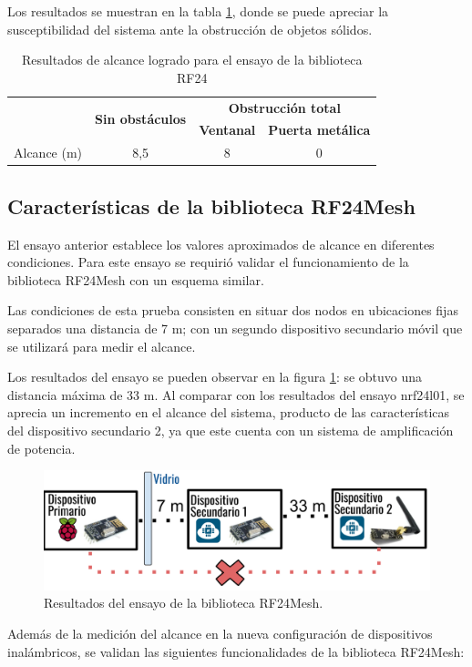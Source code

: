 Los resultados se muestran en la tabla \ref{tab:tabla_1}, donde se puede apreciar la susceptibilidad del sistema ante la obstrucción de objetos sólidos.

\begin{table}[h]
\centering
\caption[Resultados ensayo biblioteca RF24]{Resultados de alcance logrado para el ensayo de la biblioteca RF24}
\begin{tabular}{lccc}
\toprule
\textbf{}                       & \multirow{2}{*}{\textbf{Sin obstáculos}} & \multicolumn{2}{c}{\textbf{Obstrucción total}} \\
\textbf{}                       &                                          & \textbf{Ventanal}  & \textbf{Puerta metálica}  \\
\midrule
\multicolumn{1}{c}{Alcance (m)} & 8,5                                      & 8                  & 0                        
\\
\bottomrule
\hline                                                                        
\end{tabular}
\label{tab:tabla_1}
\end{table}


\subsection{Características de la biblioteca RF24Mesh}

El ensayo anterior establece los valores aproximados de alcance en diferentes condiciones. Para este ensayo se requirió validar el funcionamiento de la biblioteca RF24Mesh \cite{rf24mesh} con un esquema similar.

Las condiciones de esta prueba consisten en situar dos nodos en ubicaciones fijas separados una distancia de 7 m; con un segundo dispositivo secundario móvil que se utilizará para medir el alcance.

Los resultados del ensayo se pueden observar en la figura \ref{fig:figura_d}: se obtuvo una distancia máxima de 33 m. Al comparar con los resultados del ensayo nrf24l01, se aprecia un incremento en el alcance del sistema, producto de las características del dispositivo secundario 2, ya que este cuenta con un sistema de amplificación de potencia.

\begin{figure}[ht]
	\centering
	\includegraphics[scale=.3]{./Figures/Capitulo4/Figura_D.png}
	\caption{Resultados del ensayo de la biblioteca RF24Mesh.}
	\label{fig:figura_d}
\end{figure}
\break
Además de la medición del alcance en la nueva configuración de dispositivos inalámbricos, se validan las siguientes funcionalidades de la biblioteca RF24Mesh:


